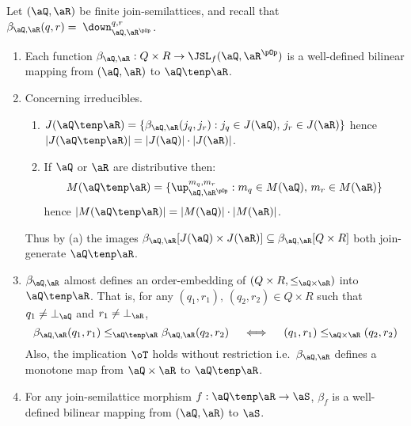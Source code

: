 \documentclass{article}
\begin{document}
\begin{lemma}
\label{lem:tenp_basic}
\item
Let $(\aQ,\aR)$ be finite join-semilattices, and recall that $\beta_{\aQ,\aR}(q,r) = \;\down_{\aQ,\aR^{\pOp}}^{q,r}$.
\begin{enumerate}
\item
Each function $\beta_{\aQ,\aR} : Q \times R \to \JSL_f(\aQ,\aR^{\pOp})$ is a well-defined bilinear mapping from $(\aQ,\aR)$ to $\aQ \tenp \aR$.

\item
Concerning irreducibles.

\begin{enumerate}
\item
$J(\aQ \tenp \aR) = \{ \beta_{\aQ,\aR}(j_q,j_r) : j_q \in J(\aQ),\, j_r \in J(\aR)  \}$ hence $|J(\aQ \tenp \aR)| = |J(\aQ)| \cdot |J(\aR)|$.
\item
If $\aQ$ or $\aR$ are distributive then:
\[
M(\aQ \tenp \aR) = \{ \up_{\aQ,\aR^{\pOp}}^{m_q,m_r} : m_q \in M(\aQ), \, m_r \in M(\aR) \}
\]
hence $|M(\aQ \tenp \aR)| = |M(\aQ)| \cdot |M(\aR)|$.
\end{enumerate}

Thus by (a) the images $\beta_{\aQ,\aR}[J(\aQ)\times J(\aR)] \subseteq \beta_{\aQ,\aR}[Q \times R]$ both join-generate $\aQ \tenp \aR$.

\item
$\beta_{\aQ,\aR}$ almost defines an order-embedding of $(Q \times R,\leq_{\aQ \times \aR})$ into $\aQ \tenp \aR$. That is, for any $(q_1,r_1),\,(q_2,r_2) \in Q \times R$ such that $q_1 \neq \bot_\aQ$ and $r_1 \neq \bot_\aR$,
\[
\beta_{\aQ,\aR}(q_1,r_1) \leq_{\aQ \tenp \aR} \beta_{\aQ,\aR}(q_2,r_2)
\quad\iff\quad
(q_1,r_1) \leq_{\aQ \times \aR} (q_2,r_2)
\]
Also, the implication $\oT$ holds without restriction i.e.\ $\beta_{\aQ, \aR}$ defines a monotone map from $\aQ \times \aR$ to $\aQ \tenp \aR$.

\item
For any join-semilattice morphism $f : \aQ \tenp \aR \to \aS$,  $\beta_f$ is a well-defined bilinear mapping from $(\aQ,\aR)$ to $\aS$.

\end{enumerate}
\end{lemma}
\end{document}
